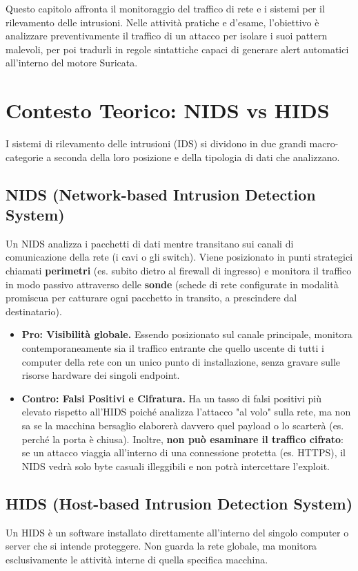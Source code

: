 \documentclass[12pt,a4paper]{report}
\begin{document}
	Questo capitolo affronta il monitoraggio del traffico di rete e i sistemi per il rilevamento delle intrusioni. Nelle attività pratiche e d'esame, l'obiettivo è analizzare preventivamente il traffico di un attacco per isolare i suoi pattern malevoli, per poi tradurli in regole sintattiche capaci di generare alert automatici all'interno del motore Suricata.
	
	\section{Contesto Teorico: NIDS vs HIDS}
	I sistemi di rilevamento delle intrusioni (IDS) si dividono in due grandi macro-categorie a seconda della loro posizione e della tipologia di dati che analizzano.
	
	\subsection{NIDS (Network-based Intrusion Detection System)}
	Un NIDS analizza i pacchetti di dati mentre transitano sui canali di comunicazione della rete (i cavi o gli switch). Viene posizionato in punti strategici chiamati \textbf{perimetri} (es. subito dietro al firewall di ingresso) e monitora il traffico in modo passivo attraverso delle \textbf{sonde} (schede di rete configurate in modalità promiscua per catturare ogni pacchetto in transito, a prescindere dal destinatario).
	
	\begin{itemize}
		\item \textbf{Pro: Visibilità globale.} Essendo posizionato sul canale principale, monitora contemporaneamente sia il traffico entrante che quello uscente di tutti i computer della rete con un unico punto di installazione, senza gravare sulle risorse hardware dei singoli endpoint.
		\item \textbf{Contro: Falsi Positivi e Cifratura.} Ha un tasso di falsi positivi più elevato rispetto all'HIDS poiché analizza l'attacco "al volo" sulla rete, ma non sa se la macchina bersaglio elaborerà davvero quel payload o lo scarterà (es. perché la porta è chiusa). Inoltre, \textbf{non può esaminare il traffico cifrato}: se un attacco viaggia all'interno di una connessione protetta (es. HTTPS), il NIDS vedrà solo byte casuali illeggibili e non potrà intercettare l'exploit.
	\end{itemize}
	
	\subsection{HIDS (Host-based Intrusion Detection System)}
	Un HIDS è un software installato direttamente all'interno del singolo computer o server che si intende proteggere. Non guarda la rete globale, ma monitora esclusivamente le attività interne di quella specifica macchina.
	
\end{document}

